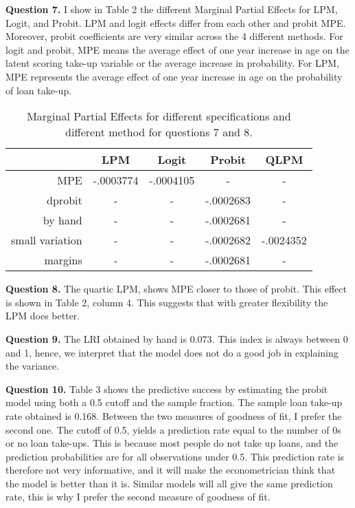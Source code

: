 \documentclass{article}
\theoremstyle{definition}
\begin{document}

\textbf{Question 7.} I show in Table 2 the different Marginal Partial Effects for LPM, Logit, and Probit. LPM and logit effects differ from each other and probit MPE.  Moreover, probit coefficients are very similar across the 4 different methods. For logit and probit, MPE means the average effect of one year increase in age on the latent scoring take-up variable or the average increase in probability. For LPM, MPE represents the average effect of one year increase in age on the probability of loan take-up. 

\begin{table}[htbp]\centering
\begin{tabular}{rcccc}
	& LPM & Logit & Probit & QLPM \\\hline
	\hline
	MPE & -.0003774  & -.0004105  & - & -\\
	dprobit & - & - & -.0002683 & - \\
	by hand & - & - &-.0002681  & - \\
	small variation & - & - & -.0002682  &  -.0024352\\
	margins & - & - & -.0002681 & - \\
\end{tabular}
\caption{Marginal Partial Effects for different specifications and different method for questions 7 and 8. }
\end{table}

\textbf{Question 8.} The quartic LPM, shows MPE closer to those of probit. This effect is shown in Table 2, column 4. This suggests that with greater flexibility the LPM does better.

\textbf{Question 9.} The LRI obtained by hand is $0.073$. This index is always between 0 and 1, hence, we interpret that the model does not do a good job in explaining the variance.  

\textbf{Question 10.} Table 3 shows the predictive success by estimating the probit model using both a 0.5 cutoff and the sample fraction. The sample loan take-up rate obtained is 0.168. Between the two measures of goodness of fit, I prefer the second one. The cutoff of 0.5, yields a prediction rate equal to the number of 0s or no loan take-ups. This is because most people do not take up loans, and the prediction probabilities are for all observations under 0.5. This prediction rate is therefore not very informative, and it will make the econometrician think that the model is better than it is. Similar models will all give the same prediction rate, this is why I prefer the second measure of goodness of fit.
\end{document}
